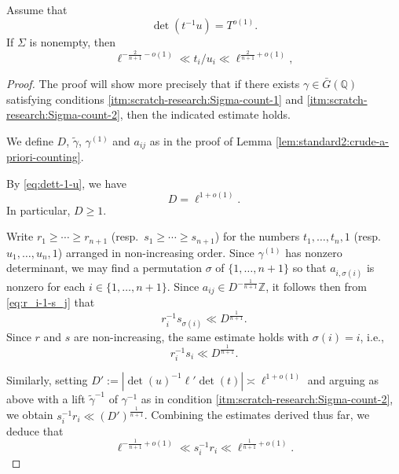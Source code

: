 \begin{lemma}\label{lem:scratch-research:if-sigma-nonempty}
  Assume that
  \begin{equation}\label{eq:dett-1-u}
    \det(t^{-1} u) = T^{o(1)}.
  \end{equation}
  If $\Sigma$ is nonempty, then
  \begin{equation}\label{eq:d--frac2n+1-0}
    \ell^{-\frac{2}{n+1} - o(1)} \ll t_i / u_i \ll \ell^{\frac{2}{n+1}+o(1)},
  \end{equation}
\end{lemma}
\begin{proof}
  The proof will show more precisely that if there exists $\gamma \in \bar{G}(\mathbb{Q})$ satisfying conditions \eqref{itm:scratch-research:Sigma-count-1} and \eqref{itm:scratch-research:Sigma-count-2}, then the indicated estimate holds.

  We define $D$, $\tilde{\gamma}$, $\gamma^{(1)}$ and $a_{i j}$ as in the proof of Lemma \ref{lem:standard2:crude-a-priori-counting}.

  By \eqref{eq:dett-1-u}, we have
  \begin{equation}\label{eq:d-=-ell1}
    D = \ell^{1 + o(1)}.
  \end{equation}
  In particular, $D \geq 1$.

  Write $r_1 \geq \dotsb \geq r_{n+1}$ (resp.\ $s_1 \geq \dotsb \geq s_{n+1}$) for the numbers $t_1,\dotsc,t_n,1$ (resp.\ $u_1,\dotsc,u_n,1$) arranged in non-increasing order.  Since $\gamma^{(1)}$ has nonzero determinant, we may find a permutation $\sigma$ of $\{1, \dotsc, n+1\}$ so that $a_{i,\sigma(i)}$ is nonzero for each $i \in \{1, \dotsc, n+1\}$.  Since $a_{i j} \in D^{- \frac{1}{n+1}} \mathbb{Z}$, it follows then from \eqref{eq:r_i-1-s_j} that
  \begin{equation}\label{eq:r_i-1-s_sigmai}
    r_i^{-1} s_{\sigma(i)} \ll D^{\frac{1}{n+1}}.
  \end{equation}
  Since $r$ and $s$ are non-increasing, the same estimate holds with $\sigma(i) = i$, i.e.,
  \begin{equation}\label{eq:r_i-1-s_i}
    r_i^{-1} s_i \ll D^{\frac{1}{n+1}}.
  \end{equation}

  Similarly, setting $D' := |\det(u)^{-1} \ell ' \det(t)| \asymp \ell^{1+o(1)}$ and arguing as above with a lift $\tilde{\gamma}^{-1}$ of $\gamma^{-1}$ as in condition \eqref{itm:scratch-research:Sigma-count-2}, we obtain $s_i^{-1} r_i \ll (D') ^{\frac{1}{n+1}}$.  Combining the estimates derived thus far, we deduce that
  \begin{equation}\label{eq:ell--frac1n+1}
    \ell^{- \frac{1}{n+1} + o(1)} \ll s_i^{-1} r_i \ll \ell^{\frac{1}{n+1} + o(1)}.
  \end{equation}


\end{proof}

